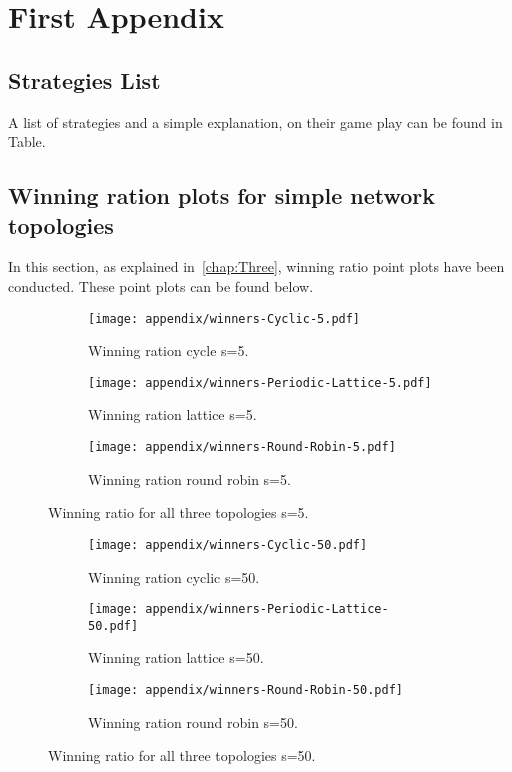 \chapter{First Appendix}
\section{Strategies List}
\label{append:strategies}
A list of strategies and a simple explanation, on their game play can be found in
Table.

\section{Winning ration plots for simple network topologies}
\label{append:wining-ratio-further-plot}
In this section, as explained in~\ref{chap:Three}, winning ratio point plots
have been conducted. These point plots can be found below.
\begin{figure}[H]
\centering
    \begin{subfigure}[t]{1\textwidth}
    \centering
        \texttt{[image: appendix/winners-Cyclic-5.pdf]}
    \caption{Winning ration cycle s=5.}
    \end{subfigure}
\hfill
    \begin{subfigure}[t]{1\textwidth}\centering
    \centering
        \texttt{[image: appendix/winners-Periodic-Lattice-5.pdf]}
    \caption{Winning ration lattice s=5.}
    \end{subfigure}
\hfill
    \begin{subfigure}[t]{1\textwidth}\centering
    \centering
        \texttt{[image: appendix/winners-Round-Robin-5.pdf]}
    \caption{Winning ration round robin s=5.}
    \end{subfigure}
\caption{Winning ratio for all three topologies s=5.}
\label{fig:winning-five}

\end{figure}

\begin{figure}[H]
\centering
    \begin{subfigure}[t]{1\textwidth}
    \centering
        \texttt{[image: appendix/winners-Cyclic-50.pdf]}
    \caption{Winning ration cyclic s=50.}
    \end{subfigure}
\hfill
    \begin{subfigure}[t]{1\textwidth}\centering
    \centering
        \texttt{[image: appendix/winners-Periodic-Lattice-50.pdf]}
    \caption{Winning ration lattice s=50.}
    \end{subfigure}
\hfill
    \begin{subfigure}[t]{1\textwidth}\centering
    \centering
        \texttt{[image: appendix/winners-Round-Robin-50.pdf]}
    \caption{Winning ration round robin s=50.}
    \end{subfigure}
\caption{Winning ratio for all three topologies s=50.}
\label{fig:winning-fifty}
\end{figure}

